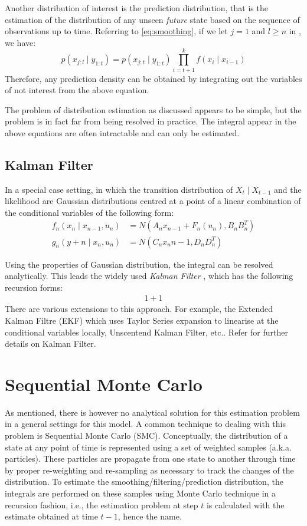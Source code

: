 Another distribution of interest is  the prediction distribution, that is the estimation of the distribution of any unseen \emph{future} state based on the sequence of observations up to time. Referring to \eqref{eq:smoothing}, if we let $j = 1$ and $l \geq n$ in , we have:
\begin{equation}
  p(x_{j:l} \mid y_{1:t}) = p(x_{j:t} \mid y_{1:t}) \prod^k_{i=t+1} f(x_i \mid x_{i-1})
\end{equation}
Therefore, any prediction density can be obtained by integrating out the variables of not interest from the above equation.

The problem of distribution estimation as discussed appears to be simple, but the problem is in fact far from being resolved in practice. The integral appear in the above equations are often intractable and can only be estimated.

\subsection{Kalman Filter}
In a special case setting, in which the transition distribution of $X_t \mid X_{t-1}$ and the likelihood are Gaussian distributions centred at a point of a linear combination of the conditional variables of the following form:
\begin{align}
  f_n(x_n \mid x_{n-1}, u_n) &= N(A_n x_{n-1} + F_n(u_n), B_n B^T_n) \nonumber \\
  g_n(y+n \mid x_n, u_n)    &= N(C_n x_n{n-1}, D_nD^T_n)
\end{align}

Using the properties of Gaussian distribution, the integral can be resolved analytically. This leads the widely used \emph{Kalman Filter} \cite{KGE60}, which has the following recursion forms:
\begin{align}
  1+1
\end{align}
There are various extensions to this approach. For example, the Extended Kalman Filtre (EKF) which uses Taylor Series expansion to linearise at the conditional variables locally, Unscentend Kalman Filter, etc.. Refer \cite{WG95} for further details on Kalman Filter.

\section{Sequential Monte Carlo}
As mentioned, there is however no analytical solution for this estimation problem in a general settings for this model. A common  technique to dealing with this problem is Sequential Monte Carlo (SMC). Conceptually, the distribution of a state at any point of time is represented using a set of weighted samples (a.k.a. particles). These particles are propagate from one state to another through time by proper re-weighting and re-sampling as necessary to track the changes of the distribution. To estimate the smoothing/filtering/prediction distribution, the integrals are performed on these samples using Monte Carlo technique in a recursion fashion, i.e., the estimation problem at step $t$ is calculated with the estimate obtained at time $t-1$, hence the name.

